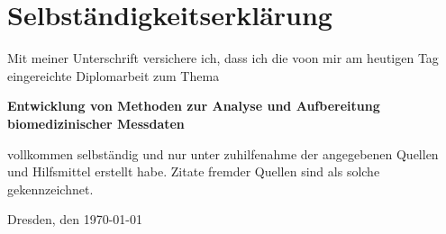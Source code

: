 \chapter*{Selbst\"andigkeitserkl\"arung}

Mit meiner Unterschrift versichere ich, dass ich die voon mir am heutigen Tag eingereichte Diplomarbeit zum Thema
\begin{center}
	\textbf{Entwicklung von Methoden zur Analyse und Aufbereitung biomedizinischer Messdaten}
\end{center}
vollkommen selbst\"andig und nur unter zuhilfenahme der angegebenen Quellen und Hilfsmittel erstellt habe. Zitate fremder Quellen sind als solche gekennzeichnet.

\vspace{3cm}\noindent\hspace{1.5cm}
Dresden, den \today
